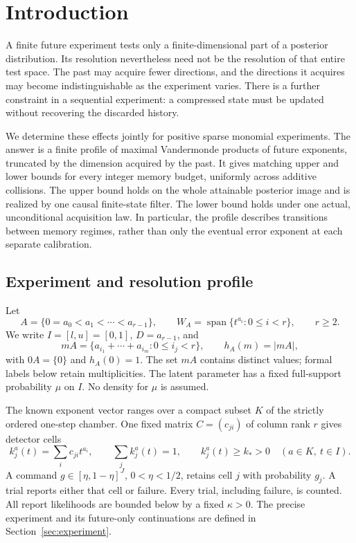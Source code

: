 \section{Introduction}
A finite future experiment tests only a finite-dimensional part of a
posterior distribution. Its resolution nevertheless need not be the
resolution of that entire test space. The past may acquire fewer
directions, and the directions it acquires may become indistinguishable
as the experiment varies. There is a further constraint in a sequential
experiment: a compressed state must be updated without recovering the
discarded history.

We determine these effects jointly for positive sparse monomial
experiments. The answer is a finite profile of maximal Vandermonde
products of future exponents, truncated by the dimension acquired by
the past. It gives matching upper and lower bounds for every integer
memory budget, uniformly across additive collisions. The upper bound
holds on the whole attainable posterior image and is realized by one
causal finite-state filter. The lower bound holds under one actual,
unconditional acquisition law. In particular, the profile describes
transitions between memory regimes, rather than only the eventual
error exponent at each separate calibration.

\subsection{Experiment and resolution profile}
Let
\[
 A=\{0=a_0<a_1<\cdots<a_{r-1}\},\qquad
 W_A=\operatorname{span}\{t^{a_i}:0\le i<r\},\qquad r\ge2.
\]
We write $I=[l,u]=[0,1]$, $D=a_{r-1}$, and
\[
 mA=\{a_{i_1}+\cdots+a_{i_m}:0\le i_j<r\},\qquad
 h_A(m)=|mA|,
\]
with $0A=\{0\}$ and $h_A(0)=1$. The set $mA$ contains distinct
values; formal labels below retain multiplicities. The latent
parameter has a fixed full-support probability $\mu$ on $I$.
No density for $\mu$ is assumed.

The known exponent vector ranges over a compact subset $K$ of the
strictly ordered one-step chamber. One fixed matrix $C=(c_{ji})$ of
column rank $r$ gives detector cells
\[
 k_j^a(t)=\sum_i c_{ji}t^{a_i},\qquad
 \sum_j k_j^a(t)=1,\qquad k_j^a(t)\ge k_*>0
 \quad(a\in K,\ t\in I).
\]
A command $g\in[\eta,1-\eta]^J$, $0<\eta<1/2$, retains cell $j$
with probability $g_j$. A trial reports either that cell or failure.
Every trial, including failure, is counted. All report likelihoods are
bounded below by a fixed $\kappa>0$. The precise experiment and its
future-only continuations are defined in Section~\ref{sec:experiment}.


